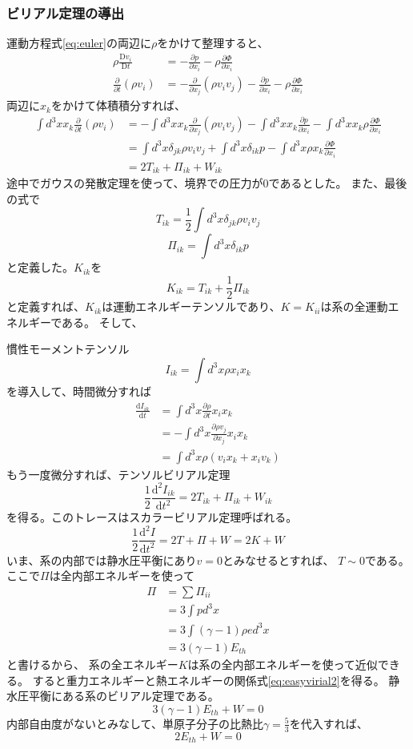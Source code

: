 \documentclass{jsarticle}
\newcommand{\pder}[2][]{\frac{\partial#1}{\partial#2}}
\newcommand{\dder}[2][]{\frac{\mathrm{d}#1}{\mathrm{d}#2}}
\newcommand{\ddder}[2][]{\frac{\mathrm{d^2}#1}{\mathrm{d}#2^2}}
\newcommand{\Dder}[2][]{\frac{\mathrm{D}#1}{\mathrm{D}#2}}
\newcommand{\half}{\frac{1}{2}}
\newcommand{\ethe}{E_{th}}
\newcommand{\beq}{\begin{equation}}
\newcommand{\eeq}{\end{equation}}
\begin{document}
\subsubsection{ビリアル定理の導出}
運動方程式\eqref{eq:euler}の両辺に$\rho$をかけて整理すると、
\begin{align}
    \rho\Dder[v_i]{t} &= - \pder[p]{x_i} - \rho\pder[\Phi]{x_i}\\
    \pder[]{t}(\rho v_i) &= - \pder[]{x_j}(\rho v_iv_j) - \pder[p]{x_i} - \rho\pder[\Phi]{x_i}
\end{align}
両辺に$x_k$をかけて体積積分すれば、
\begin{align}
    \int d^3x x_k \pder[]{t}(\rho v_i) &= - \int d^3x x_k\pder[]{x_j}(\rho v_iv_j) - \int d^3x x_k\pder[p]{x_i} - \int d^3x x_k\rho\pder[\Phi]{x_i}\\
                                       &=  \int d^3x \delta_{jk}\rho v_iv_j + \int d^3x \delta_{ik}p - \int d^3x \rho x_k\pder[\Phi]{x_i}\label{eq:pzero}\\
                                       &= 2T_{ik} + \Pi_{ik} + W_{ik}
\end{align}
途中でガウスの発散定理を使って、境界での圧力が$0$であるとした。
また、最後の式で
\beq
T_{ik} = \half\int d^3x \delta_{jk}\rho v_iv_j
\eeq
\beq
 \Pi_{ik} =  \int d^3x \delta_{ik}p
\eeq
と定義した。$K_{ik}$を
\beq
K_{ik} = T_{ik} + \half\Pi_{ik}
\eeq
と定義すれば、$K_{ik}$は運動エネルギーテンソルであり、$K = K_{ii}$は系の全運動エネルギーである。
そして、

慣性モーメントテンソル
\beq
    I_{ik} = \int d^3x\rho x_i x_k 
\eeq
を導入して、時間微分すれば
\begin{align}
    \dder[I_{ik}]{t} &= \int d^3x \pder[\rho]{t} x_i x_k \\
                     &= -\int d^3x \pder[\rho v_j]{x_j} x_i x_k\\
                     &= \int d^3x \rho(v_ix_k + x_i v_k)
\end{align}
もう一度微分すれば、テンソルビリアル定理
\beq
\half \ddder[I_{ik}]{t} = 2T_{ik} + \Pi_{ik} + W_{ik}
\eeq
を得る。このトレースはスカラービリアル定理呼ばれる。
\beq
\half \ddder[I]{t} = 2T + \Pi + W = 2K + W
\eeq
いま、系の内部では静水圧平衡にあり$v=0$とみなせるとすれば、
$T \sim 0$である。
ここで$\Pi$は全内部エネルギーを使って
\begin{align}
    \Pi &= \sum \Pi_{ii}\\
&= 3 \int p d^3x\\
&= 3 \int (\gamma -1) \rho e d^3x\\
&= 3(\gamma - 1)\ethe
\end{align}
と書けるから、
系の全エネルギー$K$は系の全内部エネルギーを使って近似できる。
すると重力エネルギーと熱エネルギーの関係式\eqref{eq:easyvirial2}を得る。
静水圧平衡にある系のビリアル定理である。
\beq
3(\gamma -1)\ethe + W = 0\label{eq:easyvirial2}
\eeq
内部自由度がないとみなして、単原子分子の比熱比$\gamma = \frac{5}{3}$を代入すれば、
\beq
    2\ethe + W = 0
\eeq
\end{document}
